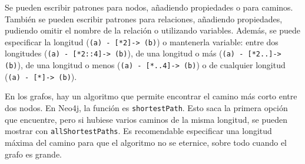 Se pueden escribir patrones para nodos, añadiendo propiedades o para caminos. También se pueden escribir patrones para relaciones, añadiendo propiedades, pudiendo omitir el nombre de la relación o utilizando variables. Además, se puede especificar la longitud (\texttt{(a) - [*2]-> (b)}) o mantenerla variable: entre dos longitudes (\texttt{(a) - [*2::4]-> (b)}), de una longitud o más (\texttt{(a) - [*2..]-> (b)}), de una longitud o menos (\texttt{(a) - [*..4]-> (b)}) o de cualquier longitud (\texttt{(a) - [*]-> (b)}).

En los grafos, hay un algoritmo que permite encontrar el camino más corto entre dos nodos. En Neo4j, la función es \texttt{shortestPath}. Esto saca la primera opción que encuentre, pero si hubiese varios caminos de la misma longitud, se pueden mostrar con \texttt{allShortestPaths}. Es recomendable especificar una longitud máxima del camino para que el algoritmo no se eternice, sobre todo cuando el grafo es grande. 
